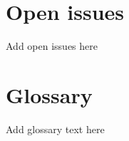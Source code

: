 \documentclass[10pt,a4paper]{article}
\begin{document}
\section{Open issues}
Add open issues here
\section{Glossary}
Add glossary text here
\end{document}

